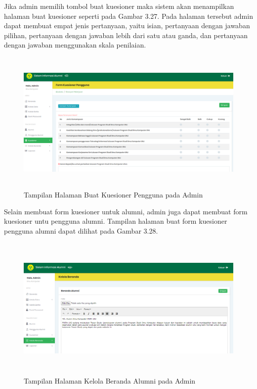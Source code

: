 Jika admin memilih tombol buat kuesioner maka sistem akan menampilkan halaman buat kuesioner seperti pada Gambar 3.27. Pada halaman tersebut admin dapat membuat empat jenis pertanyaan, yaitu isian, pertanyaan dengan jawaban pilihan, pertanyaan dengan jawaban lebih dari satu atau ganda, dan pertanyaan dengan jawaban menggunakan skala penilaian.

\begin{figure}[H]
	\centering
	\includegraphics[width=14cm,height=7cm]{gambar/tampilan/admin_buatKuesionerPengguna}
	\caption{Tampilan Halaman Buat Kuesioner Pengguna pada Admin }
	\label{ui_adminBuatKuesionerPenggunaAlumni}
\end{figure}

Selain membuat form kuesioner untuk alumni, admin juga dapat membuat form kuesioner untu pengguna alumni. Tampilan halaman buat form kuesioner pengguna alumni dapat dilihat pada Gambar 3.28. 

\begin{figure}[H]
	\centering
	\includegraphics[width=14cm,height=7cm]{gambar/tampilan/admin_kelolaBerandaAlumni}
	\caption{Tampilan Halaman Kelola Beranda Alumni pada Admin }
	\label{ui_adminKelolaBerandaAlumni}
\end{figure}

